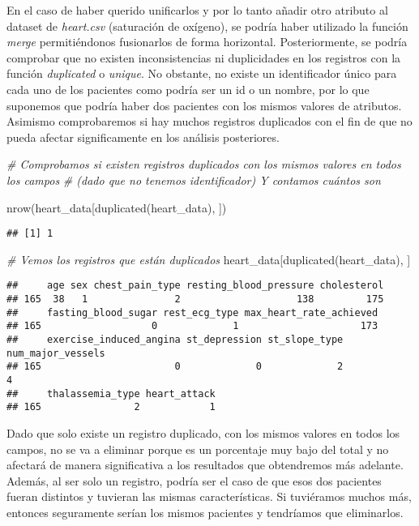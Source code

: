 \documentclass[
]{article}
\newenvironment{Shaded}{\begin{snugshade}}{\end{snugshade}}
\newcommand{\CommentTok}[1]{\textcolor[rgb]{0.56,0.35,0.01}{\textit{#1}}}
\newcommand{\FunctionTok}[1]{\textcolor[rgb]{0.00,0.00,0.00}{#1}}
\newcommand{\NormalTok}[1]{#1}
\begin{document}
En el caso de haber querido unificarlos y por lo tanto añadir otro
atributo al dataset de \emph{heart.csv} (saturación de oxígeno), se
podría haber utilizado la función \emph{merge} permitiéndonos
fusionarlos de forma horizontal. Posteriormente, se podría comprobar que
no existen inconsistencias ni duplicidades en los registros con la
función \emph{duplicated} o \emph{unique}. No obstante, no existe un
identificador único para cada uno de los pacientes como podría ser un id
o un nombre, por lo que suponemos que podría haber dos pacientes con los
mismos valores de atributos. Asimismo comprobaremos si hay muchos
registros duplicados con el fin de que no pueda afectar significamente
en los análisis posteriores.

\begin{Shaded}
\begin{Highlighting}[]
\CommentTok{\# Comprobamos si existen registros duplicados con los mismos valores en todos los campos }
\CommentTok{\# (dado que no tenemos identificador) Y contamos cuántos son}

\FunctionTok{nrow}\NormalTok{(heart\_data[}\FunctionTok{duplicated}\NormalTok{(heart\_data), ])}
\end{Highlighting}
\end{Shaded}

\begin{verbatim}
## [1] 1
\end{verbatim}

\begin{Shaded}
\begin{Highlighting}[]
\CommentTok{\# Vemos los registros que están duplicados}
\NormalTok{heart\_data[}\FunctionTok{duplicated}\NormalTok{(heart\_data), ]}
\end{Highlighting}
\end{Shaded}

\begin{verbatim}
##     age sex chest_pain_type resting_blood_pressure cholesterol
## 165  38   1               2                    138         175
##     fasting_blood_sugar rest_ecg_type max_heart_rate_achieved
## 165                   0             1                     173
##     exercise_induced_angina st_depression st_slope_type num_major_vessels
## 165                       0             0             2                 4
##     thalassemia_type heart_attack
## 165                2            1
\end{verbatim}

Dado que solo existe un registro duplicado, con los mismos valores en
todos los campos, no se va a eliminar porque es un porcentaje muy bajo
del total y no afectará de manera significativa a los resultados que
obtendremos más adelante. Además, al ser solo un registro, podría ser el
caso de que esos dos pacientes fueran distintos y tuvieran las mismas
características. Si tuviéramos muchos más, entonces seguramente serían
los mismos pacientes y tendríamos que eliminarlos.
\end{document}
